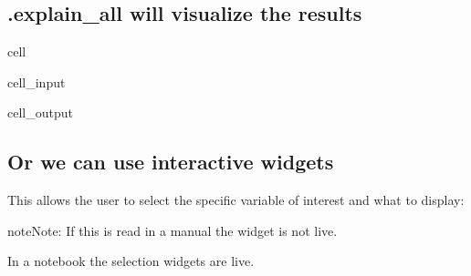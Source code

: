 \documentclass[letterpaper,10pt,english]{jupyterBook}
\begin{document}
\subsection{.explain\_all will visualize the results}
\label{\detokenize{content/howto/attribution/Attribution background:explain-all-will-visualize-the-results}}
\begin{sphinxuseclass}{cell}\begin{sphinxVerbatimInput}

\begin{sphinxuseclass}{cell_input}
\begin{sphinxVerbatim}[commandchars=\\\{\}]
  
\end{sphinxVerbatim}

\end{sphinxuseclass}\end{sphinxVerbatimInput}
\begin{sphinxVerbatimOutput}

\begin{sphinxuseclass}{cell_output}
\noindent{}

\end{sphinxuseclass}\end{sphinxVerbatimOutput}

\end{sphinxuseclass}

\subsection{Or we can use interactive widgets}
\label{\detokenize{content/howto/attribution/Attribution background:or-we-can-use-interactive-widgets}}
\sphinxAtStartPar
This allows the user to select the specific variable of interest and what to display:

\begin{sphinxadmonition}{note}{Note:}
\sphinxAtStartPar
If this is read in a manual the widget is not live.

\sphinxAtStartPar
In a notebook the selection widgets are live.
\end{sphinxadmonition}
\end{document}
